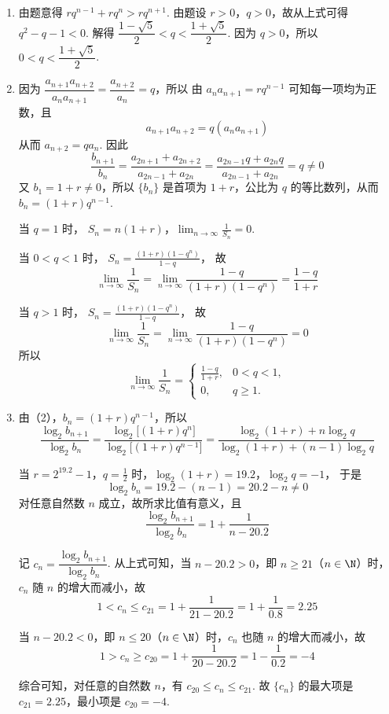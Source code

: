 \begin{solution}
\begin{enumerate}
\item 由题意得 \(r q^{n - 1} + rq^n > rq^{n + 1}\).
由题设 \(r > 0\)，\(q > 0\)，故从上式可得 \(q^2 - q - 1 < 0\).
解得 \(\dfrac{1 - \sqrt{5}}{2} < q < \dfrac{1 + \sqrt{5}}{2}\).
因为 \(q > 0\)，所以 \(0 < q < \dfrac{1 + \sqrt{5}}{2}\).

\item 因为 \(\dfrac{a_{n + 1}a_{n + 2}}{a_n a_{n + 1}} = \dfrac{a_{n + 2}}{a_n} = q\)，所以
由 \(a_na_{n+1}=rq^{n-1}\) 可知每一项均为正数，且
\[
a_{n+1}a_{n+2}=q(a_na_{n+1})
\]
从而 \(a_{n+2}=qa_n\). 因此
\[
\frac{b_{n + 1}}{b_n}
= \frac{a_{2n + 1} + a_{2n + 2}}{a_{2n - 1} + a_{2n}}
= \frac{a_{2n - 1}q + a_{2n}q}{a_{2n - 1} + a_{2n}}
= q \neq 0
\]
又 \(b_1 = 1 + r \neq 0\)，所以 \(\{b_n\}\) 是首项为 \(1 + r\)，公比为 \(q\) 的等比数列，从而 \(b_n = (1 + r)q^{n - 1}\).

当 \(q = 1\) 时，
\(S_n = n(1 + r)\)，\(\displaystyle\lim_{n \to \infty}\frac{1}{S_n} = 0\).

当 \(0 < q < 1\) 时，
\(S_n = \frac{(1 + r)(1 - q^n)}{1 - q}\)，
故
\[
\displaystyle\lim_{n \to \infty}\frac{1}{S_n}
= \displaystyle\lim_{n \to \infty}\frac{1 - q}{(1 + r)(1 - q^n)}
= \frac{1 - q}{1 + r}
\]

当 \(q > 1\) 时，
\(S_n = \frac{(1 + r)(1 - q^n)}{1 - q}\)，
故
\[
\displaystyle\lim_{n \to \infty}\frac{1}{S_n}
= \displaystyle\lim_{n \to \infty}\frac{1 - q}{(1 + r)(1 - q^n)}
= 0
\]
所以
\[
\displaystyle\lim_{n \to \infty}\frac{1}{S_n}
=
\begin{cases}
\frac{1 - q}{1 + r}, & 0 < q < 1,\\
0, & q \geqslant 1.
\end{cases}
\]

\item 由（2），\(b_n = (1 + r)q^{n - 1}\)，所以
\[
\frac{\log_2 b_{n + 1}}{\log_2 b_n}
= \frac{\log_2\bigl[(1 + r)q^n\bigr]}{\log_2\bigl[(1 + r)q^{n - 1}\bigr]}
= \frac{\log_2(1 + r) + n\log_2 q}{\log_2(1 + r) + (n - 1)\log_2 q}
\]

当 \(r = 2^{19.2} - 1\)，\(q = \frac{1}{2}\) 时，\(\log_2(1 + r) = 19.2\)，\(\log_2 q = -1\)，
于是
\[
\log_2 b_n=19.2-(n-1)=20.2-n\neq 0
\]
对任意自然数 \(n\) 成立，故所求比值有意义，且
\[
\dfrac{\log_2 b_{n + 1}}{\log_2 b_n} = 1 + \dfrac{1}{n - 20.2}
\]

记 \(c_n = \dfrac{\log_2 b_{n + 1}}{\log_2 b_n}\).
从上式可知，当 \(n - 20.2 > 0\)，即 \(n \geqslant 21\)（\(n \in \N\)）时，\(c_n\) 随 \(n\) 的增大而减小，故
\[
1 < c_n \leqslant c_{21}
= 1 + \frac{1}{21 - 20.2}
= 1 + \frac{1}{0.8}
= 2.25
\]

当 \(n - 20.2 < 0\)，即 \(n \leqslant 20\)（\(n \in \N\)）时，\(c_n\) 也随 \(n\) 的增大而减小，故
\[
1 > c_n \geqslant c_{20}
= 1 + \frac{1}{20 - 20.2}
= 1 - \frac{1}{0.2}
= -4
\]

综合可知，对任意的自然数 \(n\)，有 \(c_{20} \leqslant c_n \leqslant c_{21}\).
故 \(\{c_n\}\) 的最大项是 \(c_{21} = 2.25\)，最小项是 \(c_{20} = -4\).
\end{enumerate}
\end{solution}
